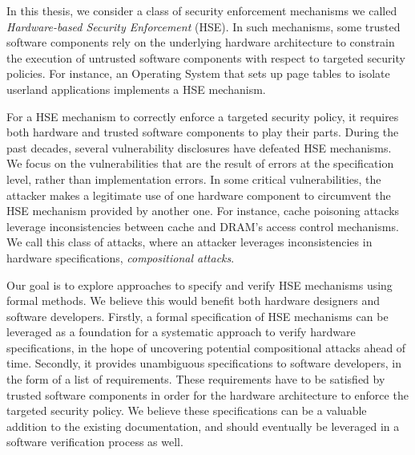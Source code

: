In this thesis, we consider a class of security enforcement mechanisms we called
\emph{Hardware-based Security Enforcement} (HSE).
%
In such mechanisms, some trusted software components rely on the underlying
hardware architecture to constrain the execution of untrusted software
components with respect to targeted security policies.
%
For instance, an Operating System that sets up page tables to isolate userland
applications implements a HSE mechanism.

For a HSE mechanism to correctly enforce a targeted security policy, it requires
both hardware and trusted software components to play their parts.
%
During the past decades, several vulnerability disclosures have defeated HSE
mechanisms.
%
We focus on the vulnerabilities that are the result of errors at the
specification level, rather than implementation errors.
%
In some critical vulnerabilities, the attacker makes a legitimate use of one
hardware component to circumvent the HSE mechanism provided by another one.
%
For instance, cache poisoning attacks leverage inconsistencies between cache
and DRAM's access control mechanisms.
%
We call this class of attacks, where an attacker leverages inconsistencies in
hardware specifications, \emph{compositional attacks}.

Our goal is to explore approaches to specify and verify HSE mechanisms using
formal methods.
%
We believe this would benefit both hardware designers and software developers.
%
Firstly, a formal specification of HSE mechanisms can be leveraged as a
foundation for a systematic approach to verify hardware specifications, in the
hope of uncovering potential compositional attacks ahead of time.
%
Secondly, it provides unambiguous specifications to software developers, in the
form of a list of requirements.
%
These requirements have to be satisfied by trusted software components in order
for the hardware architecture to enforce the targeted security policy.
%
We believe these specifications can be a valuable addition to the existing
documentation, and should eventually be leveraged in a software verification
process as well.

